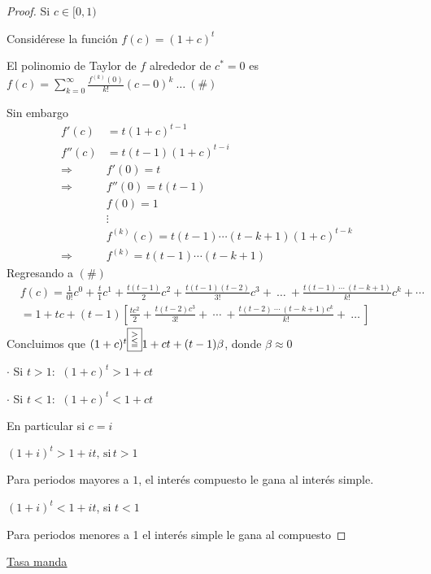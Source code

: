\begin{proof}
Si $c\in [0,1)$

Considérese la función $f(c) = (1+c)^t$

El polinomio de Taylor de $f$ alrededor de $c^*=0$ es $f(c) = \sum_{k=0}^{\infty} \frac{f^{(k)}(0)}{k!}(c-0)^k \: \ldots \: (\#)$

Sin embargo 
\begin{align*}
f'(c) &= t(1+c)^{t-1}&\\
f''(c) &= t(t-1)(1+c)^{t-i}&\\
\Longrightarrow \: &f'(0) = t&\\
\Longrightarrow \: &f''(0) = t(t-1)&\\
& f(0) = 1&\\
&\vdots&\\
&f^{(k)}(c) = t(t-1) \cdots (t-k+1)(1+c)^{t-k}&\\
\Longrightarrow &f^{(k)} = t(t-1)\cdots (t-k+1)&
\end{align*}
Regresando a $(\#)$
\begin{align*}
&f(c) = \frac{1}{0!}c^0 + \frac{t}{1}c^1 + \frac{t(t-1)}{2}c^2 + \frac{t(t-1)(t-2)}{3!}c^3 + \: \ldots \: + \frac{t(t-1)\: \cdots  \: (t-k+1)}{k!}c^k + \cdots\\
&=1+tc + (t-1)\left[\frac{tc^2}{2}+ \frac{t(t-2)c^3}{3!} + \: \cdots \: + \frac{t(t-2) \: \cdots \: (t-k+1)c^k}{k!}+ \: \ldots \:\right] 
\end{align*}
Concluimos que $(1+c)^t \boxed{\mathrel{\stackon[1pt]{$\mathrel{\stackon[1pt]{$\scriptstyle=$}{$\scriptstyle<$}}$}{$\scriptstyle>$}}} 1+ct+(t-1)\beta$, donde $\beta \approx 0$
\medskip

$\cdot$ Si $t>1$: $\: (1+c)^t > 1+ct$

$\cdot$ Si $t<1$: $\: (1+c)^t < 1+ct$

En particular si $c=i$

\ul{$(1+i)^t > 1+it, \, \text{si} \, t>1$}

Para periodos mayores a $1$, el interés compuesto le gana al interés simple.

\ul{$(1+i)^t < 1+it$}, si $t<1$

Para periodos menores a 1 el interés simple le gana al compuesto
\end{proof}

\uline{\uline{Tasa manda}}

